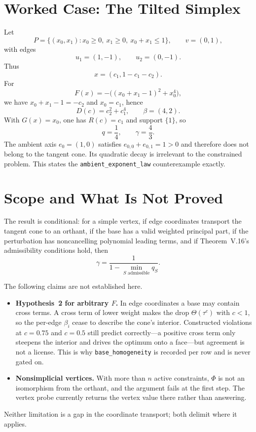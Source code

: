 \documentclass[11pt]{article}
\theoremstyle{definition}
\theoremstyle{remark}
\begin{document}
\section{Worked Case: The Tilted Simplex}

Let
\[
  P=\{(x_0,x_1):x_0\geq0,\ x_1\geq0,\ x_0+x_1\leq1\},
  \qquad v=(0,1),
\]
with edges
\[
  u_1=(1,-1),
  \qquad u_2=(0,-1).
\]
Thus
\[
  x=(c_1,1-c_1-c_2).
\]
For
\[
  F(x)=-\bigl((x_0+x_1-1)^2+x_0^4\bigr),
\]
we have $x_0+x_1-1=-c_2$ and $x_0=c_1$, hence
\[
  D(c)=c_2^2+c_1^4,
  \qquad
  \beta=(4,2).
\]
With $G(x)=x_0$, one has $R(c)=c_1$ and support $\{1\}$, so
\[
  q=\frac14,
  \qquad
  \gamma=\frac43.
\]
The ambient axis $e_0=(1,0)$ satisfies $e_{0,0}+e_{0,1}=1>0$ and therefore
does not belong to the tangent cone.  Its quadratic decay is irrelevant to the
constrained problem.  This states the \texttt{ambient\_exponent\_law}
counterexample exactly.

\section{Scope and What Is Not Proved}

The result is conditional: for a simple vertex, if edge coordinates transport
the tangent cone to an orthant, if the base has a valid weighted principal
part, if the perturbation has noncancelling polynomial leading terms, and if
Theorem~V.16's admissibility conditions hold, then
\[
  \boxed{
    \gamma=\frac{1}{1-\min_{S\text{ admissible}}q_S}
  }.
\]

The following claims are not established here.

\begin{itemize}
  \item \textbf{Hypothesis~2 for arbitrary $F$.}
  In edge coordinates a base may contain cross terms.  A cross term of lower
  weight makes the drop $\Theta(\tau^c)$ with $c<1$, so the per-edge
  $\beta_i$ cease to describe the cone's interior.  Constructed violations at
  $c=0.75$ and $c=0.5$ still predict correctly---a positive cross term only
  steepens the interior and drives the optimum onto a face---but agreement is
  not a license.  This is why \texttt{base\_homogeneity} is recorded per row
  and is never gated on.

  \item \textbf{Nonsimplicial vertices.}
  With more than $n$ active constraints, $\Phi$ is not an isomorphism from the
  orthant, and the argument fails at the first step.  The vertex probe
  currently returns the vertex value there rather than answering.
\end{itemize}

Neither limitation is a gap in the coordinate transport; both delimit where
it applies.
\end{document}
